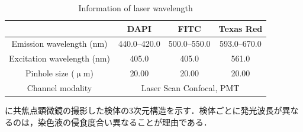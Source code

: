 \begin{table}[H]
	\centering
	\caption{Information of laser wavelength}
	\label{tab:レーザー波長}
	\begin{tabular}{cccc}\toprule
		& DAPI & FITC & Texas Red \\ \midrule
		Emission wavelength (nm) & 440.0--420.0 & 500.0--550.0 & 593.0--670.0 \\ 
		Excitation wavelength (nm) & 405.0 & 405.0 & 561.0 \\ 
		Pinhole size ($\upmu$m) & 20.00 & 20.00 & 20.00 \\ 
		Channel modality & \multicolumn{3}{c}{Laser Scan Confocal, PMT } \\ \bottomrule
	\end{tabular}
\end{table}


に共焦点顕微鏡の撮影した検体の3次元構造を示す．検体ごとに発光波長が異なるのは，染色液の侵食度合い異なることが理由である．

